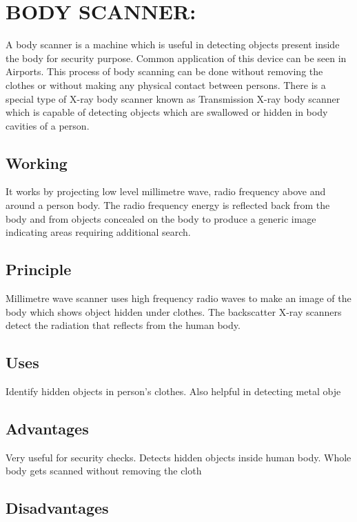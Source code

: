 \documentclass[12pt]{article}
\begin{document}
\section{BODY SCANNER:}

A body scanner is a machine which is useful in detecting objects present inside the body  for security purpose. Common application of this device can be seen in Airports. This process of body scanning can be done without removing the clothes or without making any physical contact between persons. There is a special type of X-ray body scanner known as Transmission X-ray body scanner which is capable of detecting objects which are swallowed or hidden in body  cavities  of a person.





\subsection{Working}
It works by projecting low level millimetre wave, radio frequency above and around a person body. The radio frequency energy is reflected back from the body and from objects concealed on the body to produce a generic image indicating areas requiring additional search.

\subsection{Principle}
Millimetre wave scanner uses high frequency radio waves to make an image of the body which shows object hidden under clothes. The backscatter X-ray scanners detect the radiation that reflects from the human body.

\subsection{Uses}

Identify hidden objects in person’s clothes. Also helpful in detecting metal obje

\subsection{Advantages}

Very useful for security checks.
Detects hidden objects inside human body.
Whole body gets scanned without removing the cloth

\subsection{Disadvantages}
\end{document}
